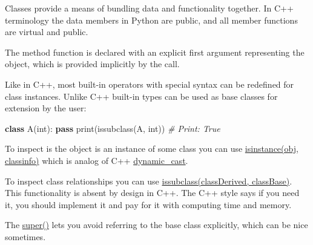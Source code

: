 \documentclass[
]{article}
\newenvironment{Shaded}{}{}
\newcommand{\BuiltInTok}[1]{#1}
\newcommand{\CommentTok}[1]{\textcolor[rgb]{0.38,0.63,0.69}{\textit{#1}}}
\newcommand{\ControlFlowTok}[1]{\textcolor[rgb]{0.00,0.44,0.13}{\textbf{#1}}}
\newcommand{\KeywordTok}[1]{\textcolor[rgb]{0.00,0.44,0.13}{\textbf{#1}}}
\newcommand{\NormalTok}[1]{#1}
\begin{document}
Classes provide a means of bundling data and functionality together. In
C++ terminology the data members in Python are public, and all member
functions are virtual and public.

The method function is declared with an explicit first argument
representing the object, which is provided implicitly by the call.

Like in C++, most built-in operators with special syntax can be
redefined for class instances. Unlike C++ built-in types can be used as
base classes for extension by the user:

\begin{Shaded}
\begin{Highlighting}[]
\KeywordTok{class}\NormalTok{ A(}\BuiltInTok{int}\NormalTok{): }\ControlFlowTok{pass}
\BuiltInTok{print}\NormalTok{(}\BuiltInTok{issubclass}\NormalTok{(A, }\BuiltInTok{int}\NormalTok{))}
\CommentTok{\# Print: True}
\end{Highlighting}
\end{Shaded}

To inspect is the object is an instance of some class you can use
\href{https://docs.python.org/3/library/functions.html\#isinstance}{isinstance(obj,
classinfo)} which is analog of C++
\href{https://en.cppreference.com/w/cpp/language/dynamic_cast}{dynamic\_cast}.

To inspect class relationships you can use
\href{https://docs.python.org/3/library/functions.html\#issubclass}{issubclass(classDerived,
classBase)}. This functionality is absent by design in C++. The C++
style says if you need it, you should implement it and pay for it with
computing time and memory.

The
\href{https://docs.python.org/3/library/functions.html\#super}{super()}
lets you avoid referring to the base class explicitly, which can be nice
sometimes.
\end{document}
